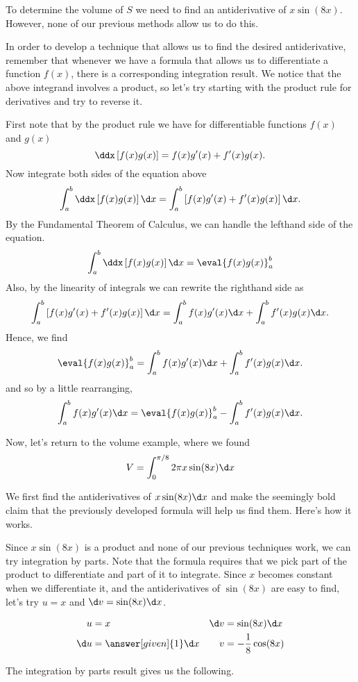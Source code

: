 \documentclass{ximera}
\begin{document}
\begin{model}
To determine the volume of $S$ we need to find an antiderivative of $x\sin(8x)$. However, none of our previous methods allow us to do this.

In order to develop a technique that allows us to find the desired antiderivative, remember that whenever we have a formula that allows us to differentiate a function $f(x)$, there is a corresponding integration result.  We notice that the above integrand involves a product, so let's try starting with the product rule for derivatives and try to reverse it.  

First note that by the product rule we have for differentiable functions $f(x)$ and $g(x)$
\[
\ddx \left[f(x)g(x)\right] = f(x)g'(x) + f'(x) g(x).
\]
Now integrate both sides of the equation above
\[
\int_a^b \ddx \left[ f(x) g(x) \right] \d x = \int_a^b \left[f(x)g'(x) + f'(x) g(x)\right] \d x.
\]
By the Fundamental Theorem of Calculus, we can handle the lefthand side of the equation.
\[
\int_a^b \ddx \left[f(x) g(x)\right] \d x = \eval{f(x)g(x)}_a^b
\]
Also, by the linearity of integrals we can rewrite the righthand side as
\[
 \int_a^b \left[f(x)g'(x) + f'(x) g(x)\right] \d x = \int_a^b f(x)g'(x)\d x + \int_a^b f'(x) g(x) \d x.
\]
Hence, we find
\[
\eval{f(x)g(x)}_a^b = \int_a^b f(x)g'(x)\d x + \int_a^b f'(x) g(x) \d x.
\]
and so by a little rearranging,
\[
 \int_a^b f(x)g'(x)\d x = \eval{f(x)g(x)}_a^b -  \int_a^b f'(x) g(x) \d x.
\]

Now, let's return to the volume example, where we found
\[
V=\int_{0}^{\pi/8} 2 \pi x\sin(8x) \d x
\]

We first find the antiderivatives of $x\sin(8x) \d x$ and make the seemingly bold claim that the previously developed formula will help us find them.  Here's how it works.

Since $x\sin(8x)$ is a product and none of our previous techniques work, we can try integration by parts.  Note that the formula requires that we pick part of the product to differentiate and part of it to integrate.  Since $x$ becomes constant when we differentiate it, and the antiderivatives of $\sin(8x)$ are easy to find, let's try $u=x$ and $\d v=\sin(8x) \d x$.  

\begin{align*}
u &= x & \d v & = \sin(8x) \d x \\
 \d u &= \answer[given]{1} \d x & v&=-\frac{1}{8}\cos(8x)
\end{align*}

The integration by parts result gives us the following.


\end{model}
\end{document}
